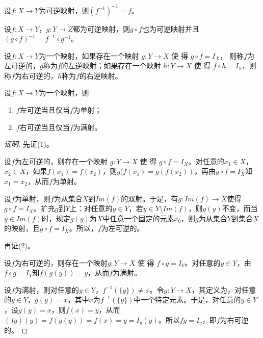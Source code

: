  \begin{Thm}
    设$f:X\to Y$为可逆映射，则$(f^{-1})^{-1}=f$。
  \end{Thm}
  \begin{Thm}
    设$f:X\to Y$，$g:Y\to Z$都为可逆映射，则$g\circ f$也为可逆映射并且$(g\circ f)^{-1} = f^{-1}\circ g^{-1}$。
  \end{Thm}

    \begin{Def}
    设$f:X\to Y$为一个映射，如果存在一个映射 $g:Y\to X$ 使 得 $g\circ f = I_X$，
    则称$f$为左可逆的，$g$称为$f$的左逆映射；如果存在一个映射
    $h:Y\to X$ 使 得 $f\circ h=I_Y$，则称$f$为右可逆的，$h$称为$f$的右逆映射。
  \end{Def}
  \begin{Thm}
    设$f:X\to Y$为一个映射，则
    \begin{enumerate}
    \item $f$左可逆当且仅当$f$为单射；
    \item $f$右可逆当且仅当$f$为满射。
    \end{enumerate}
  \end{Thm}
  \begin{proof}[证明]
    先证(1)。

设$f$为左可逆的，则存在一个映射 $g:Y\to X$ 使 得 $g\circ f = I_X$。对任意的$x_1\in X$，$x_2\in X$，如果$f(x_1)=f(x_2)$，则$g(f(x_1)=g(f(x_2))$，再由$g\circ f = I_{X}$知$x_1=x_2$，从而$f$为单射。

设$f$为单射，则$f$为从集合$X$到$Im(f)$的双射。于是，有$g:Im(f)\to X$使得$g\circ f = I_X$。扩充$g$到$Y$上：对任意的$y\in Y$，若$y\in Y\setminus Im(f)$，则$g(y)$不变，而当$y\in Im(f)$时，规定$g(y)$为$X$中任意一个固定的元素$x_0$，则$g$为从集合$Y$到集合$X$的映射，且$g\circ f = I_X$。所以，$f$为左可逆的。

再证(2)。

设$f$为右可逆的，则存在一个映射$g:Y\to X$ 使 得 $f\circ g=I_Y$。对任意的$y\in Y$，由$f\circ g = I_{Y}$知$f(g(y))=y$，从而$f$为满射。

设$f$为满射，则对任意的$y\in Y$，$f^{-1}(\{y\})\neq \phi$。令$g:Y\to X$，其定义为，对任意的$y\in Y$，$g(y)=x$，其中$x$为$f^{-1}(\{y\})$中一个特定元素。于是，对任意的$y\in Y$，设$g(y)=x$，则$f(x)=y$，从而$(fg)(y) = f(g(y)) = f(x) = y = I_y(y)$。所以$fg=I_y$，即$f$为右可逆的。
  \end{proof}

